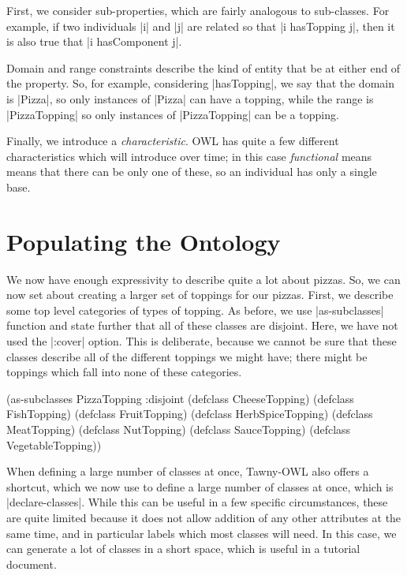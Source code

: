 First, we consider sub-properties, which are fairly analogous to sub-classes.
For example, if two individuals |i| and |j| are related so that
|i hasTopping j|, then it is also true that |i hasComponent j|.

Domain and range constraints describe the kind of entity that be at either end
of the property. So, for example, considering |hasTopping|, we say that the
domain is |Pizza|, so only instances of |Pizza| can have a topping, while the
range is |PizzaTopping| so only instances of |PizzaTopping| can be a topping. 

Finally, we introduce a \emph{characteristic}. OWL has quite a few different
characteristics which will introduce over time; in this case \emph{functional}
means means that there can be only one of these, so an individual has only a
single base.


\section{Populating the Ontology}
\label{sec:populating-ontology}

We now have enough expressivity to describe quite a lot about pizzas. So, we
can now set about creating a larger set of toppings for our pizzas. First, we
describe some top level categories of types of topping. As before, we use
|as-subclasses| function and state further that all of these classes are
disjoint. Here, we have not used the |:cover| option. This is deliberate,
because we cannot be sure that these classes describe all of the different
toppings we might have; there might be toppings which fall into none of these
categories. 

\begin{tawny}
(as-subclasses
 PizzaTopping
 :disjoint
 (defclass CheeseTopping)
 (defclass FishTopping)
 (defclass FruitTopping)
 (defclass HerbSpiceTopping)
 (defclass MeatTopping)
 (defclass NutTopping)
 (defclass SauceTopping)
 (defclass VegetableTopping))
\end{tawny}

When defining a large number of classes at once, Tawny-OWL also offers a
shortcut, which we now use to define a large number of classes at once, which
is |declare-classes|. While this can be useful in a few specific
circumstances, these are quite limited because it does not allow addition of
any other attributes at the same time, and in particular labels which most
classes will need. In this case, we can generate a lot of classes in a short
space, which is useful in a tutorial document.


